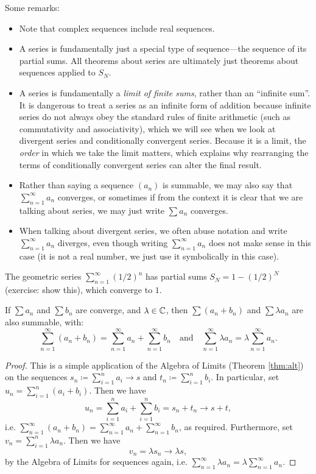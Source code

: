 \documentclass[../analysis1.tex]{subfiles}
\begin{document}
Some remarks:
\begin{itemize}
    \item Note that complex sequences include real sequences.
    \item A series is fundamentally just a special type of sequence—the sequence of its partial sums. All theorems about series are ultimately just theorems about sequences applied to $S_N$.
    \item A series is fundamentally a \textit{limit of finite sums}, rather than an ``infinite sum''. It is dangerous to treat a series as an infinite form of addition because infinite series do not always obey the standard rules of finite arithmetic (such as commutativity and associativity), which we will see when we look at divergent series and conditionally convergent series. Because it is a limit, the \textit{order} in which we take the limit matters, which explains why rearranging the terms of conditionally convergent series can alter the final result.
    \item Rather than saying a sequence $(a_n)$ is summable, we may also say that $\sum_{n=1}^{\infty} a_n$ converges, or sometimes if from the context it is clear that we are talking about series, we may just write $\sum a_n$ converges.
    \item When talking about divergent series, we often abuse notation and write $\sum_{n=1}^{\infty}a_n$ diverges, even though writing $\sum_{n=1}^{\infty}a_n$ does not make sense in this case (it is not a real number, we just use it symbolically in this case).
\end{itemize}

 
\begin{example}
    The geometric series $\sum_{n=1}^\infty (1/2)^n$ has partial sums $S_N = 1 - (1/2)^N$ (exercise: show this), which converge to $1$.
\end{example}

\begin{theorem}
\label{thm:alts}
    \begin{shaded*}
        If $\sum a_n$ and $\sum b_n$ are converge, and $\lambda \in \mathbb{C}$, then $\sum (a_n + b_n)$ and $\sum \lambda a_n$ are also summable, with:
        $$ \sum_{n=1}^\infty (a_n + b_n) = \sum_{n=1}^\infty a_n + \sum_{n=1}^\infty b_n \quad \text{and} \quad \sum_{n=1}^\infty \lambda a_n = \lambda \sum_{n=1}^\infty a_n. $$
    \end{shaded*}
\end{theorem}
\begin{proof}
    This is a simple application of the Algebra of Limits (Theorem \ref{thm:alt}) on the sequences $s_n\coloneqq \sum_{i=1}^n a_i\to s$ and $t_n\coloneqq \sum_{i=1}^nb_i$. In particular, set $u_n=\sum_{i=1}^n(a_i+b_i)$. Then we have $$u_n=\sum_{i=1}^na_i+\sum_{i=1}^nb_i=s_n+t_n\to s+t, $$
    i.e. $\sum_{n=1}^{\infty}(a_n+b_n)=\sum_{n=1}^{\infty}a_n+\sum_{n=1}^{\infty}b_n$, as required. Furthermore, set $v_n=\sum_{i=1}^{n}\lambda a_n$. Then we have $$v_n=\lambda s_n\to \lambda s,$$by the Algebra of Limits for sequences again, i.e. $\sum_{n=1}^{\infty}\lambda a_n = \lambda\sum_{n=1}^{\infty}a_n$.\qedhere
\end{proof}
\end{document}
